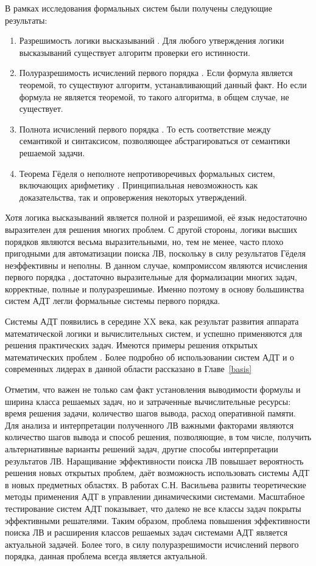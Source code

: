 В рамках исследования формальных систем были получены следующие результаты:
\begin{enumerate}
\item Разрешимость логики высказываний \cite{mendelson}. Для любого утверждения логики высказываний существует алгоритм проверки его истинности.
\item Полуразрешимость исчислений первого порядка \cite{turing}. Если формула является теоремой, то существуют алгоритм, устанавливающий данный факт. Но если формула не является теоремой, то такого алгоритма, в общем случае, не существует.
\item Полнота исчислений первого порядка \cite{Godel1}. То есть соответствие между семантикой и синтаксисом, позволяющее абстрагироваться от семантики решаемой задачи.
\item Теорема Гёделя о неполноте непротиворечивых формальных систем, включающих арифметику \cite{Godel2}. Принципиальная невозможность как доказательства, так и опровержения некоторых утверждений.
\end{enumerate}

Хотя логика высказываний является полной и разрешимой, её язык недостаточно выразителен для решения многих проблем. С другой стороны, логики высших порядков являются весьма выразительными, но, тем не менее, часто плохо пригодными для автоматизации поиска ЛВ, поскольку в силу результатов Гёделя неэффективны и неполны. В данном случае, компромиссом являются исчисления первого порядка \cite{Frege, Sourcebook, mendelson}, достаточно выразительные для формализации многих задач, корректные, полные и полуразрешимые. Именно поэтому в основу большинства систем АДТ легли формальные системы первого порядка.

Системы АДТ появились в середине XX века, как результат развития аппарата математической логики и вычислительных систем, и успешно применяются для решения практических задач. Имеются примеры решения открытых математических проблем \cite{McCuneRob}. Более подробно об использовании систем АДТ и о современных лидерах в данной области рассказано в Главе~\ref{basis}

Отметим, что важен не только сам факт установления выводимости формулы и ширина класса решаемых задач, но и затраченные вычислительные ресурсы: время решения задачи, количество шагов вывода, расход оперативной памяти. Для анализа и интерпретации полученного ЛВ важными факторами являются количество шагов вывода и способ решения, позволяющие, в том числе, получить альтернативные варианты решений задач, другие способы интерпретации результатов ЛВ. Наращивание эффективности поиска ЛВ повышает вероятность решения новых открытых проблем, даёт возможность использовать системы АДТ в новых предметных областях. В работах С.Н. Васильева \cite{ICDS2000} развиты теоретические методы применения АДТ в управлении динамическими системами. Масштабное тестирование систем АДТ \cite{tptp} показывает, что далеко не все классы задач покрыты эффективными решателями. Таким образом, проблема повышения эффективности поиска ЛВ и расширения классов решаемых задач системами АДТ является актуальной задачей. Более того, в силу полуразрешимости исчислений первого порядка, данная проблема всегда является актуальной.

